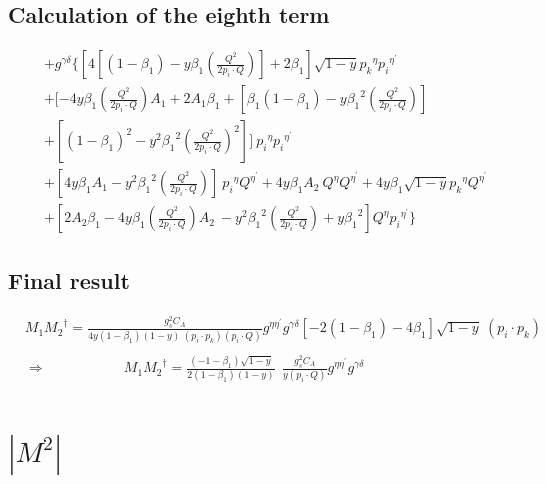 \subsection*{Calculation of the eighth term}

\begin{equation}
\begin{split} 
&+g^{{{\gamma}}{{\delta}}}\lbrace
[4[(1-\beta_1)-y\beta_1 (\frac{Q^2}{2p_i \cdot Q})] +2\beta_1]\sqrt{1-y}{p_k}^{{\eta}}{{p_i}^{{\eta}^{\prime}}}\\
&+[-4y {\beta_1} (\frac{Q^2}{2p_i \cdot Q}) A_1+2A_1\beta_1 +[\beta_1(1-\beta_1)-y {\beta_1}^2 (\frac{Q^2}{2p_i \cdot Q})]\\
&+[(1-\beta_1)^2-y^2 {\beta_1}^2 (\frac{Q^2}{2p_i \cdot Q})^2]] \:{p_i}^{{\eta}}{p_i}^{{\eta}^{\prime}}\\
&+[4y {\beta_1} A_1 -y^2 {\beta_1}^2 (\frac{Q^2}{2p_i \cdot Q})]\:{p_i}^{{\eta}}{Q}^{{\eta}^{\prime}}+4y {\beta_1} A_2 \:{Q}^{{\eta}}{Q}^{{\eta}^{\prime}}+4y {\beta_1}\sqrt{1-y}{p_k}^{{\eta}}{{Q}^{{\eta}^{\prime}}}\\
&+[2A_2\beta_1-4y {\beta_1} (\frac{Q^2}{2p_i \cdot Q}) A_2\:-y^2 {\beta_1}^2 (\frac{Q^2}{2p_i \cdot Q})+y {\beta_1}^2] {Q}^{{\eta}}{{p_i}^{{\eta}^{\prime}}}\rbrace
\end{split}
\end{equation}

\subsection*{Final result}
\begin{equation}
\begin{split}
&M_1{M_2}^{\dagger}=\frac{g_s^2 C_A}{4y(1-\beta_1) (1-y)\:(p_i \cdot p_k)(p_i \cdot Q)}
g^{{{\eta}}{{\eta}^{\prime}}}g^{{{\gamma}}{{\delta}}} [-2(1-\beta_1)-4\beta_1] \sqrt{1-y}\:({p_i}\cdot{p_k})\\\\
&\Rightarrow \:\:\:\:\:\:\:\:\:\:\:\:\:\:\:\:\:\:\:\:\:\:\:\:\:M_1{M_2}^{\dagger}=\frac{(-1-\beta_1)\sqrt{1-y}}{2(1-\beta_1)(1-y)}\:\:\frac{g_s^2 C_A}{y (p_i \cdot Q)}
g^{{{\eta}}{{\eta}^{\prime}}}g^{{{\gamma}}{{\delta}}}  \\
\end{split}
\end{equation}



\pagebreak






\section{$|M^{2}|$}

